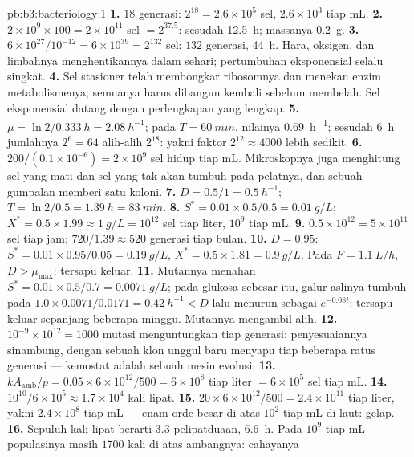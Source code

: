\begin{solution}{pb:b3:bacteriology:1}
\textbf{1.} $18$ generasi: $2^{18} = 2.6\times 10^{5}$ sel,
$2.6\times 10^{3}$ tiap mL.
\textbf{2.} $2\times 10^{9}\times 100 = 2\times 10^{11}$ sel $=
2^{37.5}$: sesudah \qty{12.5}{h}; massanya \qty{0.2}{g}.
\textbf{3.} $6\times 10^{27}/10^{-12} = 6\times 10^{39} = 2^{132}$ sel:
$132$ generasi, \qty{44}{h}. Hara, oksigen, dan limbahnya menghentikannya
dalam sehari; pertumbuhan eksponensial selalu singkat.
\textbf{4.} Sel stasioner telah membongkar ribosomnya dan menekan
enzim metabolismenya; semuanya harus dibangun kembali sebelum membelah.
Sel eksponensial datang dengan perlengkapan yang lengkap.
\textbf{5.} $\mu = \ln 2/\qty{0.333}{h} = \qty{2.08}{h^{-1}}$; pada $T =
\qty{60}{min}$, nilainya \qty{0.69}{h^{-1}}; sesudah \qty{6}{h} jumlahnya
$2^{6} = 64$ alih-alih $2^{18}$: yakni faktor $2^{12} \approx 4000$ lebih
sedikit.
\textbf{6.} $200/(0.1\times 10^{-6}) = 2\times 10^{9}$ sel hidup tiap
mL. Mikroskopnya juga menghitung sel yang mati dan sel yang tak akan tumbuh
pada pelatnya, dan sebuah gumpalan memberi satu koloni.
\textbf{7.} $D = 0.5/1 = \qty{0.5}{h^{-1}}$; $T = \ln 2/0.5 =
\qty{1.39}{h} = \qty{83}{min}$.
\textbf{8.} $S^{*} = 0.01\times 0.5/0.5 = \qty{0.01}{g/L}$; $X^{*} =
0.5\times 1.99 \approx \qty{1}{g/L} = 10^{12}$ sel tiap liter, $10^{9}$
tiap mL.
\textbf{9.} $0.5\times 10^{12} = 5\times 10^{11}$ sel tiap jam; $720/1.39
\approx 520$ generasi tiap bulan.
\textbf{10.} $D = 0.95$: $S^{*} = 0.01\times 0.95/0.05 = \qty{0.19}{g/L}$,
$X^{*} = 0.5\times 1.81 = \qty{0.9}{g/L}$. Pada $F = \qty{1.1}{L/h}$, $D
> \mu_{\max}$: tersapu keluar.
\textbf{11.} Mutannya menahan $S^{*} = 0.01\times 0.5/0.7 = \qty{0.0071}{g/L}$;
pada glukosa sebesar itu, galur aslinya tumbuh pada $1.0\times 0.0071/0.0171 =
\qty{0.42}{h^{-1}} < D$ lalu menurun sebagai $e^{-0.08t}$: tersapu keluar
sepanjang beberapa minggu. Mutannya mengambil alih.
\textbf{12.} $10^{-9}\times 10^{12} = 1000$ mutasi menguntungkan tiap
generasi: penyesuaiannya sinambung, dengan sebuah klon unggul baru menyapu
tiap beberapa ratus generasi --- kemostat adalah sebuah mesin evolusi.
\textbf{13.} $kA_{\text{amb}}/p = 0.05\times 6\times 10^{12}/500 =
6\times 10^{8}$ tiap liter $= 6\times 10^{5}$ sel tiap mL.
\textbf{14.} $10^{10}/6\times 10^{5} \approx 1.7\times 10^{4}$ kali lipat.
\textbf{15.} $20\times 6\times 10^{12}/500 = 2.4\times 10^{11}$ tiap liter,
yakni $2.4\times 10^{8}$ tiap mL --- enam orde besar di atas
$10^{2}$ tiap mL di laut: gelap.
\textbf{16.} Sepuluh kali lipat berarti $3.3$ pelipatduaan, \qty{6.6}{h}. Pada
$10^{9}$ tiap mL populasinya masih $1700$ kali di atas ambangnya: cahayanya

\end{solution}
